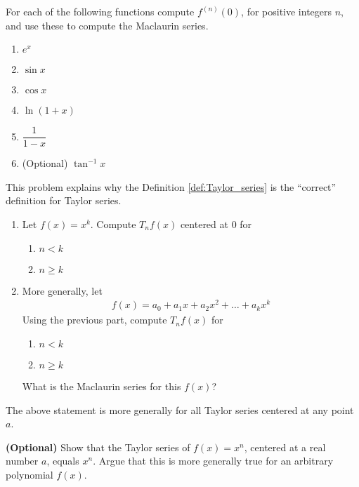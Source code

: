 \begin{exercise}
  For each of the following functions compute $f^{(n)}(0)$, for positive integers $n$, and use these to compute the Maclaurin series.
  \begin{multicols}{2}
  \begin{enumerate}
    \item $e^x$
    \item $\sin x$
    \item $\cos x$
    \item $\ln {(1+x)}$
    \item $\dfrac{1}{1-x}$
    \item (Optional) $\tan^{-1} x$
  \end{enumerate}
  \end{multicols}
\end{exercise}

\begin{exercise}
  This problem explains why the Definition \ref{def:Taylor_series} is the ``correct'' definition for Taylor series.
  \begin{enumerate}
    \item Let $f(x) = x^k$. Compute $T_n f(x)$ centered at $0$ for
    \begin{enumerate}
      \item $n < k$
      \item $n \ge k$
    \end{enumerate}
    \item More generally, let
    \begin{align*}
      f(x) = a_0 + a_1 x + a_2 x^2 + \dots + a_k x^k
    \end{align*}
    Using the previous part, compute $T_n f(x)$ for
    \begin{enumerate}
      \item $n < k$
      \item $n \ge k$
    \end{enumerate}
     What is the Maclaurin series for this $f(x)$?
  \end{enumerate}
\end{exercise}
The above statement is more generally for all Taylor series centered at any point $a$.
\begin{exercise}{\bf (Optional)}
  Show that the Taylor series of $f(x) = x^n$, centered at a real number $a$, equals $x^n$. Argue that this is more generally true for an arbitrary polynomial $f(x)$.
\end{exercise}

